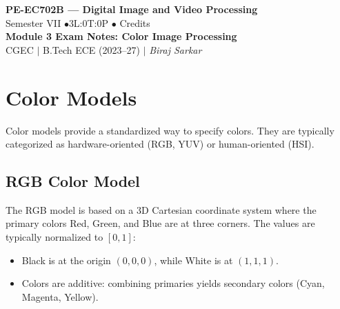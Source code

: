 \documentclass[12pt,a4paper]{article}
\begin{document}

\begin{center}
  {\LARGE\bfseries\color{myred} PE-EC702B --- Digital Image and Video Processing}\\[5pt]
  {\normalsize\color{mydark} Semester VII \quad$\bullet$\quad 3L:0T:0P \quad$\bullet$ Credits}\\[3pt]
  {\normalsize\color{myteal}\textbf{Module 3 Exam Notes: Color Image Processing}}\\[3pt]
  {\small\color{mydark} CGEC \;$|$\; B.Tech ECE (2023--27) \;$|$\; \textit{Biraj Sarkar}}
\end{center}
\vspace{2pt}
\noindent{\color{myred}\rule{\linewidth}{1.5pt}}
\vspace{2pt}

\hypersetup{linkcolor=mydark}
\tableofcontents
\hypersetup{linkcolor=myteal}
\newpage

\section{Color Models}

Color models provide a standardized way to specify colors. They are typically categorized as hardware-oriented (RGB, YUV) or human-oriented (HSI).

\subsection{RGB Color Model}
The RGB model is based on a 3D Cartesian coordinate system where the primary colors Red, Green, and Blue are at three corners. The values are typically normalized to $[0,1]$:
\begin{itemize}[leftmargin=*, itemsep=2pt]
  \item Black is at the origin $(0,0,0)$, while White is at $(1,1,1)$.
  \item Colors are additive: combining primaries yields secondary colors (Cyan, Magenta, Yellow).
\end{itemize}
\end{document}

